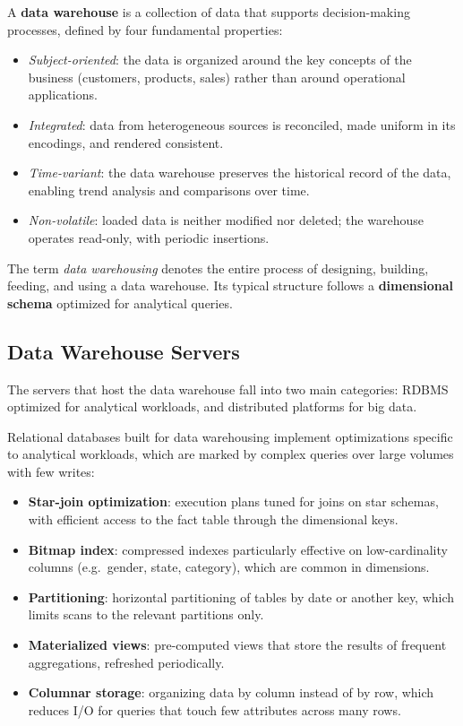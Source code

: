 \begin{theorybox}
A \textbf{data warehouse} is a collection of data that supports decision-making processes, defined by four fundamental properties:
\begin{itemize}
    \item \textit{Subject-oriented}: the data is organized around the key concepts of the business (customers, products, sales) rather than around operational applications.
    \item \textit{Integrated}: data from heterogeneous sources is reconciled, made uniform in its encodings, and rendered consistent.
    \item \textit{Time-variant}: the data warehouse preserves the historical record of the data, enabling trend analysis and comparisons over time.
    \item \textit{Non-volatile}: loaded data is neither modified nor deleted; the warehouse operates read-only, with periodic insertions.
\end{itemize}
\end{theorybox}

The term \textit{data warehousing} denotes the entire process of designing, building, feeding, and using a data warehouse. Its typical structure follows a \textbf{dimensional schema} optimized for analytical queries.

\subsection{Data Warehouse Servers}
\label{sec:dw-servers}

The servers that host the data warehouse fall into two main categories: RDBMS optimized for analytical workloads, and distributed platforms for big data.

Relational databases built for data warehousing implement optimizations specific to analytical workloads, which are marked by complex queries over large volumes with few writes:

\begin{itemize}
    \item \textbf{Star-join optimization}: execution plans tuned for joins on star schemas, with efficient access to the fact table through the dimensional keys.
    \item \textbf{Bitmap index}: compressed indexes particularly effective on low-cardinality columns (e.g.\ gender, state, category), which are common in dimensions.
    \item \textbf{Partitioning}: horizontal partitioning of tables by date or another key, which limits scans to the relevant partitions only.
    \item \textbf{Materialized views}: pre-computed views that store the results of frequent aggregations, refreshed periodically.
    \item \textbf{Columnar storage}: organizing data by column instead of by row, which reduces I/O for queries that touch few attributes across many rows.
\end{itemize}

